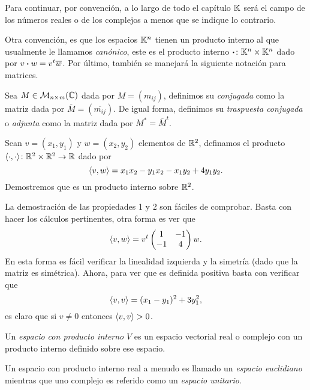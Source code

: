 Para continuar, por convención, a lo largo de todo el capítulo $\mathbb{K}$ será el campo de los números reales o de los complejos a menos que se indique lo contrario.

Otra convención, es que los espacios $\mathbb{K}^n$ tienen un producto interno al que usualmente le llamamos \emph{canónico}, este es el producto interno $\boldsymbol\cdot\colon  \mathbb{K}^n \times \mathbb{K}^n$ dado por $v \boldsymbol\cdot w = v^t \overline{w}$. Por último, también se manejará la siguiente notación para matrices.

\begin{defi}
  Sea $M \in \mathcal{M}_{n\times m}(\mathbb{C})$ dada por $M = (m_{ij})$, definimos su \emph{conjugada} como la matriz dada por $\overline{M} = (\overline{m_{ij}})$. De igual forma, definimos su \emph{traspuesta conjugada} o \emph{adjunta} como la matriz dada por $M^* = \overline{M}^t$.
\end{defi}

\begin{example}
  Sean $v = (x_1, y_1)$ y $w = (x_2, y_2)$ elementos de $\mathbb{R}^2$, definamos el producto $\langle\cdot,\cdot\rangle\colon \mathbb{R}^2 \times \mathbb{R}^2 \to \mathbb{R}$ dado por
    \[ \langle v,w\rangle = x_1 x_2 - y_1x_2 - x_1y_2 + 4y_1y_2. \]
  Demostremos que es un producto interno sobre $\mathbb{R}^2$.

  \examplesolution

  La demostración de las propiedades 1 y 2 son fáciles de comprobar. Basta con hacer los cálculos pertinentes, otra forma es ver que 
    \[
      \langle v,w\rangle = v^t \begin{pmatrix}
        1 & -1 \\ -1 & 4
      \end{pmatrix} w.
    \]
  En esta forma es fácil verificar la linealidad izquierda y la simetría (dado que la matriz es simétrica). Ahora, para ver que es definida positiva basta con verificar que
   \[
     \langle v,v\rangle = (x_1 - y_1)^2 + 3 y_1^2,
   \]
   es claro que si $v \neq 0$ entonces $\langle v,v\rangle > 0$.
\end{example}

\begin{defi}
  Un \emph{espacio con producto interno} $V$ es un espacio vectorial real o complejo con un producto interno definido sobre ese espacio.
\end{defi}

Un espacio con producto interno real a menudo es llamado un \emph{espacio euclidiano} mientras que uno complejo es referido como un \emph{espacio unitario}.

